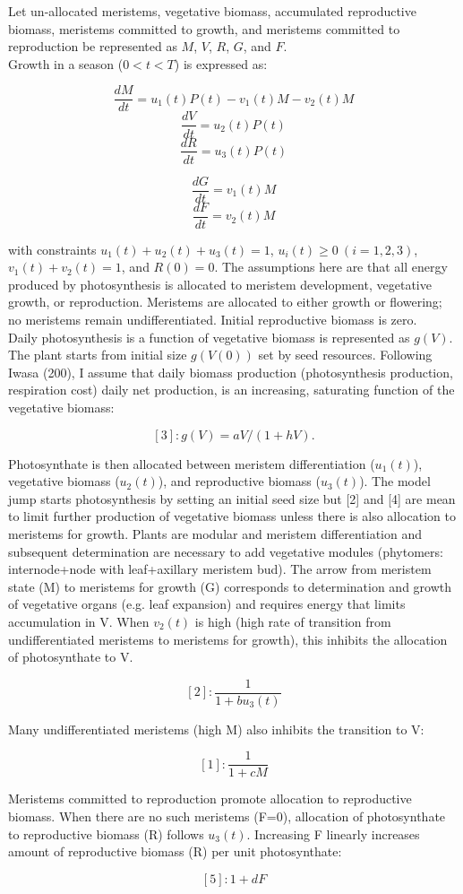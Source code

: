 \documentclass[12pt, oneside]{article}   	%
\begin{document}
    \newpage     

\noindent Let un-allocated meristems, vegetative biomass, accumulated reproductive biomass, meristems committed to growth, and meristems committed to reproduction be represented as $M$, $V$, $R$, $G$, and $F$. \\

\noindent Growth in a season ($0<t<T$) is expressed as:

$$\frac{dM}{dt} = u_1(t) P(t) - v_1(t) M - v_2(t) M  $$ 
$$\frac{dV}{dt} = u_2(t) P(t) $$
$$\frac{dR}{dt} = u_3(t) P(t) $$

$$\frac{dG}{dt} = v_1(t) M   $$
$$\frac{dF}{dt} = v_2(t) M   $$

\noindent with constraints $u_1(t) + u_2(t) + u_3(t) = 1$, $u_i(t) \geq 0 \ (i=1,2, 3)$, $v_1(t) + v_2(t) = 1$, and $R(0)=0$. The assumptions here are that all energy produced by photosynthesis is allocated to meristem development, vegetative growth, or reproduction. Meristems are allocated to either growth or flowering; no meristems remain undifferentiated. Initial reproductive biomass is zero. \\

\noindent Daily photosynthesis is a function of vegetative biomass is represented as $g(V)$. The plant starts from initial size $g(V(0))$ set by seed resources. Following Iwasa (200), I assume that daily biomass production (photosynthesis production, respiration cost) daily net production, is an increasing, saturating function of the vegetative biomass:

$$ [3]: g(V) = aV/(1 + hV).$$ 

\noindent Photosynthate is then allocated between meristem differentiation ($u_1(t)$), vegetative biomass ($u_2(t)$), and reproductive biomass ($u_3(t)$). The model jump starts photosynthesis by setting an initial seed size but [2] and [4] are mean to limit further production of vegetative biomass unless there is also allocation to meristems for growth. Plants are modular and meristem differentiation and subsequent determination are necessary to add vegetative modules (phytomers: internode+node with leaf+axillary meristem bud). The arrow from meristem state (M) to meristems for growth (G) corresponds to determination and growth of vegetative organs (e.g. leaf expansion) and requires energy that limits accumulation in V. When $v_2(t)$ is high (high rate of transition from undifferentiated meristems to meristems for growth), this inhibits the allocation of photosynthate to V. 

$$[2]: \frac{1}{1+b u_3(t) }$$

\noindent Many undifferentiated meristems (high M) also inhibits the transition to V:   

$$[1]: \frac{1}{1+c M }$$

\noindent Meristems committed to reproduction promote allocation to reproductive biomass. When there are no such meristems (F=0), allocation of photosynthate to reproductive biomass (R) follows $u_3(t)$. Increasing F linearly increases amount of reproductive biomass (R) per unit photosynthate:   

$$[5]: 1+d F $$
\end{document}
